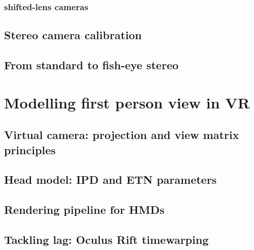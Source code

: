 \subsubsection{shifted-lens cameras}

\subsection{Stereo camera calibration}

\subsection{From standard to fish-eye stereo}


\section{Modelling first person view in VR}

\subsection{Virtual camera: projection and view matrix principles}

\subsection{Head model: IPD and ETN parameters}

\subsection{Rendering pipeline for HMDs}

\subsection{Tackling lag: Oculus Rift timewarping}










